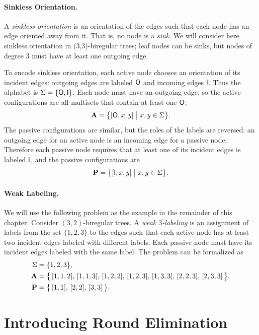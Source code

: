 \paragraph{Sinkless Orientation.} A \emph{sinkless orientation} is an orientation of the edges such that each node has an edge oriented away from it. That is, no node is a \emph{sink}. We will consider here sinkless orientation in (3,3)-biregular trees; leaf nodes can be sinks, but nodes of degree $3$ must have at least one outgoing edge.

To encode sinkless orientation, each active node chooses an orientation of its incident edges: outgoing edges are labeled $\mathsf{O}$ and incoming edges $\mathsf{I}$. Thus the alphabet is $\Sigma = \{ \mathsf{O}, \mathsf{I} \}$. Each node must have an outgoing edge, so the active configurations are all multisets that contain at least one $\mathsf{O}$:
\[
	\mathbf{A} = \bigl\{ [\mathsf{O}, x, y] \bigm| x, y \in \Sigma \bigr\}.
\]
The passive configurations are similar, but the roles of the labels are reversed: an outgoing edge for an active node is an incoming edge for a passive node. Therefore each passive node requires that at least one of its incident edges is labeled $\mathsf{I}$, and the passive configurations are
\[
	\mathbf{P} = \bigl\{ [\mathsf{I}, x, y] \bigm| x, y \in \Sigma \bigr\}.
\]

\paragraph{Weak Labeling.} We will use the following problem as the example in the remainder of this chapter. Consider $(3,2)$-biregular trees. A \emph{weak $3$-labeling} is an assignment of labels from the set $\{1,2,3\}$ to the edges such that each active node has at least two incident edges labeled with different labels. Each passive node must have its incident edges labeled with the same label. The problem can be formalized as
\begin{align*}
	\Sigma &= \{1,2,3\}, \\
	\mathbf{A} &= \bigl\{\,
		[ 1, 1, 2 ],\,
		[ 1, 1, 3 ],\,
		[ 1, 2, 2 ],\,
		[ 1, 2, 3 ],\,
		[ 1, 3, 3 ],\,
		[ 2, 2, 3 ],\,
		[ 2, 3, 3 ]
	\,\bigr\}, \\
	\mathbf{P} &= \bigl\{\,
		[ 1, 1 ],\,
		[ 2, 2 ],\,
		[ 3, 3 ]
	\,\bigr\}. 
\end{align*}

\section{Introducing Round Elimination}


